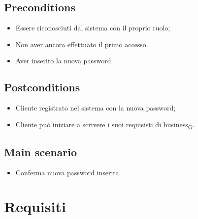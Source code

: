 \documentclass{article}
\begin{document}
    \subsection*{Preconditions}
        \begin{itemize}
            \item Essere riconosciuti dal sistema con il proprio ruolo;
            \item Non aver ancora effettuato il primo accesso.
            \item Aver inserito la nuova password.
        \end{itemize}
        
    \subsection*{Postconditions}
        \begin{itemize}
            \item Cliente registrato nel sistema con la nuova password;
            \item Cliente può iniziare a scrivere i suoi requisisti di business\textsubscript{G}.
        \end{itemize}

    \subsection*{Main scenario}
        \begin{itemize}
            \item Conferma nuova password inserita.
        \end{itemize}

\newpage
\section{Requisiti}
\end{document}
